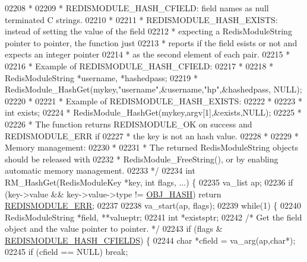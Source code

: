 \begin{DoxyCode}
{{{02208 \textcolor{comment}{ *}
02209 \textcolor{comment}{ * REDISMODULE\_HASH\_CFIELD: field names as null terminated C strings.}
02210 \textcolor{comment}{ *}
02211 \textcolor{comment}{ * REDISMODULE\_HASH\_EXISTS: instead of setting the value of the field}
02212 \textcolor{comment}{ * expecting a RedisModuleString pointer to pointer, the function just}
02213 \textcolor{comment}{ * reports if the field esists or not and expects an integer pointer}
02214 \textcolor{comment}{ * as the second element of each pair.}
02215 \textcolor{comment}{ *}
02216 \textcolor{comment}{ * Example of REDISMODULE\_HASH\_CFIELD:}
02217 \textcolor{comment}{ *}
02218 \textcolor{comment}{ *      RedisModuleString *username, *hashedpass;}
02219 \textcolor{comment}{ *      RedisModule\_HashGet(mykey,"username",&username,"hp",&hashedpass, NULL);}
02220 \textcolor{comment}{ *}
02221 \textcolor{comment}{ * Example of REDISMODULE\_HASH\_EXISTS:}
02222 \textcolor{comment}{ *}
02223 \textcolor{comment}{ *      int exists;}
02224 \textcolor{comment}{ *      RedisModule\_HashGet(mykey,argv[1],&exists,NULL);}
02225 \textcolor{comment}{ *}
02226 \textcolor{comment}{ * The function returns REDISMODULE\_OK on success and REDISMODULE\_ERR if}
02227 \textcolor{comment}{ * the key is not an hash value.}
02228 \textcolor{comment}{ *}
02229 \textcolor{comment}{ * Memory management:}
02230 \textcolor{comment}{ *}
02231 \textcolor{comment}{ * The returned RedisModuleString objects should be released with}
02232 \textcolor{comment}{ * RedisModule\_FreeString(), or by enabling automatic memory management.}
02233 \textcolor{comment}{ */}
02234 \textcolor{keywordtype}{int} RM\_HashGet(RedisModuleKey *key, \textcolor{keywordtype}{int} flags, ...) \{
02235     va\_list ap;
02236     \textcolor{keywordflow}{if} (key->value && key->value->type != \hyperlink{server_8h_a87c05ba4f7f36741864277f02a4423fb}{OBJ\_HASH}) \textcolor{keywordflow}{return} 
      \hyperlink{redismodule_8h_a3df6f5bd5247289e66f44437a7cddd49}{REDISMODULE\_ERR};
02237 
02238     va\_start(ap, flags);
02239     \textcolor{keywordflow}{while}(1) \{
02240         RedisModuleString *field, **valueptr;
02241         \textcolor{keywordtype}{int} *existsptr;
02242         \textcolor{comment}{/* Get the field object and the value pointer to pointer. */}
02243         \textcolor{keywordflow}{if} (flags & \hyperlink{redismodule_8h_a0b45cc86dbd926d0af5d59a5f4c0e0da}{REDISMODULE\_HASH\_CFIELDS}) \{
02244             \textcolor{keywordtype}{char} *cfield = va\_arg(ap,\textcolor{keywordtype}{char}*);
02245             \textcolor{keywordflow}{if} (cfield == NULL) \textcolor{keywordflow}{break};
}}}
\end{DoxyCode}
